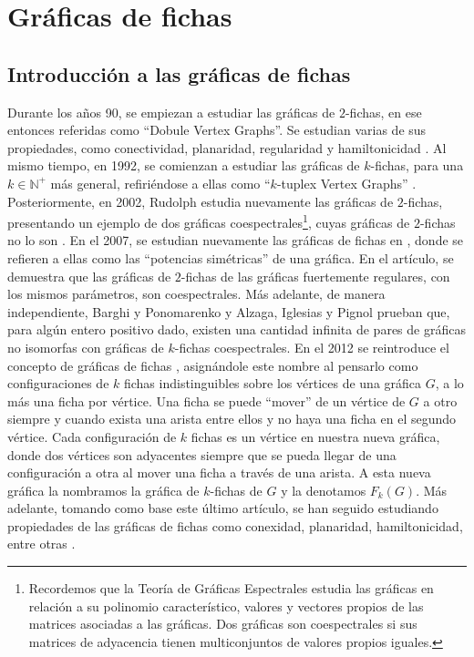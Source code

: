 \chapter{Gr\'aficas de fichas}%
\label{cap:fichass}

\section{Introducci\'on a las gr\'aficas de fichas}%
\label{sec:intro-fichas}


Durante los a\~{n}os 90, se empiezan a estudiar las gr\'aficas de $2$-fichas, en
ese entonces referidas como ``Dobule Vertex Graphs''. Se estudian varias de sus
propiedades, como conectividad, planaridad, regularidad y hamiltonicidad
\cite{alaviPlanarity, alaviDVGraphs, alaviHamilt, zhuConnect}. Al mismo tiempo,
en 1992, se comienzan a estudiar las gr\'aficas de $k$-fichas, para una $k \in
\mathbb{N^{+}}$ m\'as general, refiri\'endose a ellas como ``$k$-tuplex Vertex
Graphs'' \cite{zhuNTuples}. Posteriormente, en 2002, Rudolph estudia nuevamente
las gr\'aficas de $2$-fichas, presentando un ejemplo de dos gr\'aficas
coespectrales\footnote{Recordemos que la Teor\'ia de Gr\'aficas Espectrales
estudia las gr\'aficas en relaci\'on a su polinomio caracter\'istico, valores y
vectores propios de las matrices asociadas a las gr\'aficas. Dos gr\'aficas son
coespectrales si sus matrices de adyacencia tienen multiconjuntos de valores
propios iguales.}, cuyas gr\'aficas de $2$-fichas no lo son \cite{rudolphGInv}.
En el 2007, se estudian nuevamente las gr\'aficas de fichas en
\cite{audeanetSymPower}, donde se refieren a ellas como las ``potencias
sim\'etricas'' de una gr\'afica. En el art\'iculo, se demuestra que las
gr\'aficas de $2$-fichas de las gr\'aficas fuertemente regulares, con los mismos
par\'ametros, son coespectrales. M\'as adelante, de manera independiente, Barghi
y Ponomarenko \cite{barghi-ponomarenko} y Alzaga, Iglesias y Pignol
\cite{alzagaSymPower} prueban que, para alg\'un entero positivo dado, existen
una cantidad infinita de pares de gr\'aficas no isomorfas con gr\'aficas de
$k$-fichas coespectrales. En el 2012 se reintroduce el concepto de gr\'aficas de
fichas \cite{fabilaToken}, asign\'andole este nombre al pensarlo como
configuraciones de $k$ fichas indistinguibles sobre los v\'ertices de una
gr\'afica $G$, a lo m\'as una ficha por v\'ertice. Una ficha se puede ``mover''
de un v\'ertice de $G$ a otro siempre y cuando exista una arista entre ellos y
no haya una ficha en el segundo v\'ertice. Cada configuraci\'on de $k$ fichas es
un v\'ertice en nuestra nueva gr\'afica, donde dos v\'ertices son adyacentes
siempre que se pueda llegar de una configuraci\'on a otra al mover una ficha a
trav\'es de una arista. A esta nueva gr\'afica la nombramos la gr\'afica de
$k$-fichas de $G$ y la denotamos $F_k(G)$. M\'as adelante, tomando como base
este \'ultimo art\'iculo, se han seguido estudiando propiedades de las
gr\'aficas de fichas como conexidad, planaridad, hamiltonicidad, entre otras
\cite{carballosaRegPlan, leaConnect, riveraHamilt, adameHamilt, leaEConnect}.

